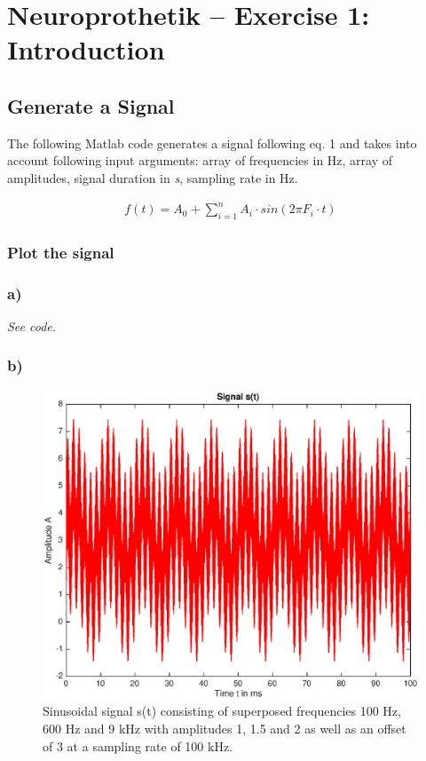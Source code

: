 \documentclass[
a4paper, 
12pt, 
]{article}
\begin{document}
	
	\thispagestyle{firstpage} 			%
	
	\section*{Neuroprothetik -- Exercise 1: Introduction}
	\subsection{Generate a Signal}
The following Matlab code generates a signal following eq. 1 and takes into account following input arguments: array of frequencies in Hz, array of amplitudes, signal duration in \textit{s}, sampling rate in Hz. 
	
\begin{align}
	f(t) = A_0 + \sum_{i=1}^{n} A_i \cdot sin(2\pi F_i \cdot t)		
\end{align}

\subsubsection{Plot the signal}
\subsubsection*{a)}
\textit{See code.}
\subsubsection*{b)}
\begin{figure}[h]
\centering
\includegraphics[width=0.7\linewidth]{Bilder/sinus_1}
\caption{Sinusoidal signal s(t) consisting of superposed frequencies 100 Hz, 600 Hz and 9 kHz with amplitudes 1, 1.5 and 2 as well as an offset of 3 at a sampling rate of 100 kHz.}
\label{fig:sinus_1}
\end{figure}
\end{document}
